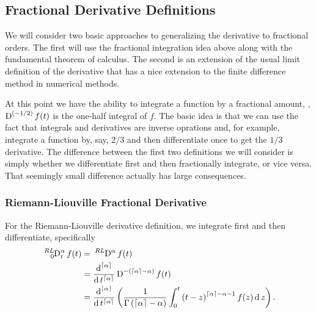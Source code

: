 \subsection{Fractional Derivative Definitions}

We will consider two basic approaches to generalizing the derivative to fractional orders. The first will use the fractional integration idea above along with the fundamental theorem of calculus. The second is an extension of the usual limit definition of the derivative that has a nice extension to the finite difference method in numerical methods.

At this point we have the ability to integrate a function by a fractional amount, \eg, $\tensor*{\D}{^{\left( -1/2 \right)}}f(t)$ is the one-half integral of $f$. The basic idea is that we can use the fact that integrals and derivatives are inverse oprations and, for example, integrate a function by, say, $2/3$ and then differentiate once to get the $1/3$ derivative. The difference between the first two definitions we will consider is simply whether we differentiate first and then fractionally integrate, or vice versa. That seemingly small difference actually has large consequences.

\subsubsection{Riemann-Liouville Fractional Derivative}

For the Riemann-Liouville derivative definition, we integrate first and then differentiate, specifically 
\begin{equation}
  \begin{aligned}
  \tensor*[^{RL}_0]{\D}{^\alpha_t}  f(t) &= \tensor*[^{RL}]{\D}{^\alpha} f(t) \\
  &= \frac{\d^{\lc \alpha \rc}}{\d t^{\lc \alpha \rc}} \tensor*[]{\D}{^{-\left( \lc \alpha \rc - \alpha \right)}} f(t) \\ 
    &= 
    \frac{\d^{\lc \alpha \rc}}{\d t^{\lc \alpha \rc}} \left( \frac{1}{\Gamma\left(\lc \alpha \rc - \alpha \right)}
    \int_0^t \left( t - z \right)^{\lc \alpha \rc - \alpha - 1} f(z) \d z \right). 
  \end{aligned}
  \label{eq:rldef}
\end{equation}

